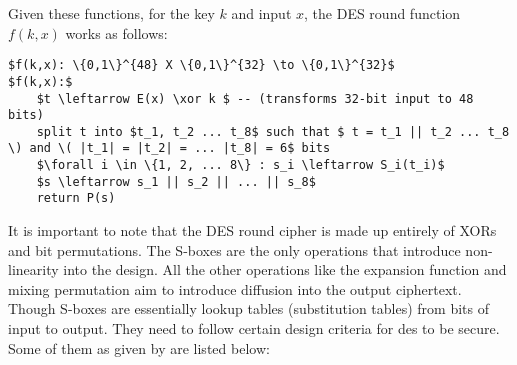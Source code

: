 Given these functions, for the key $k$ and input $x$, the DES round function $f(k, x)$ works as follows: \newline

\lstset{basicstyle=\footnotesize, columns=fullflexible}
\begin{center}
\begin{lstlisting}[mathescape]
$f(k,x): \{0,1\}^{48} X \{0,1\}^{32} \to \{0,1\}^{32}$
$f(k,x):$
    $t \leftarrow E(x) \xor k $ -- (transforms 32-bit input to 48 bits) 
    split t into $t_1, t_2 ... t_8$ such that $ t = t_1 || t_2 ... t_8 \) and \( |t_1| = |t_2| = ... |t_8| = 6$ bits 
    $\forall i \in \{1, 2, ... 8\} : s_i \leftarrow S_i(t_i)$
    $s \leftarrow s_1 || s_2 || ... || s_8$
    return P(s)
\end{lstlisting}
\end{center}

\indent It is important to note that the DES round cipher is made up entirely of XORs and bit permutations. The S-boxes are the only operations that introduce non-linearity into the design. All the other operations like the expansion function and mixing permutation aim to introduce diffusion into the output ciphertext. \newline
Though S-boxes are essentially lookup tables (substitution tables) from bits of input to output. They need to follow certain design criteria for des to be secure. Some of them as given by \cite{CopersmithDES} are listed below: 

